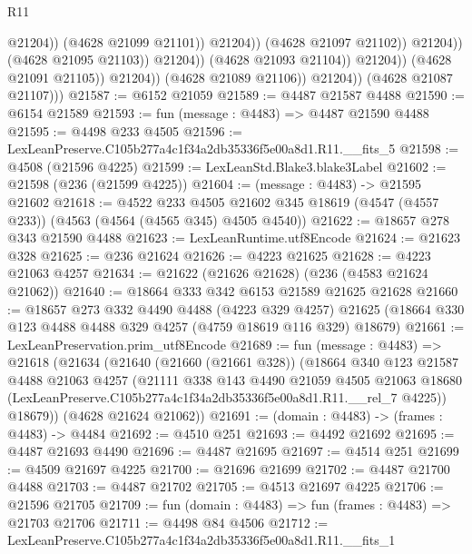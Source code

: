 \begin{lexlean}{R11}
\begin{coremodule}
                                                @21204))
                                            (@4628 @21099 @21101))
                                          @21204))
                                      (@4628 @21097 @21102))
                                    @21204))
                                (@4628 @21095 @21103))
                              @21204))
                          (@4628 @21093 @21104))
                        @21204))
                    (@4628 @21091 @21105))
                  @21204))
              (@4628 @21089 @21106))
            @21204))
        (@4628 @21087 @21107)))
@21587 := @6152 @21059
@21589 := @4487 @21587 @4488
@21590 := @6154 @21589
@21593 := fun (message : @4483) => @4487 @21590 @4488
@21595 := @4498 @233 @4505
@21596 := LexLeanPreserve.C105b277a4c1f34a2db35336f5e00a8d1.R11.__fits_5
@21598 := @4508 (@21596 @4225)
@21599 := LexLeanStd.Blake3.blake3Label
@21602 := @21598 (@236 (@21599 @4225))
@21604 := (message : @4483) -> @21595 @21602
@21618 := @4522
    @233
    @4505
    @21602
    @345
    @18619
    (@4547 (@4557 @233))
    (@4563 (@4564 (@4565 @345) @4505 @4540))
@21622 := @18657 @278 @343 @21590 @4488
@21623 := LexLeanRuntime.utf8Encode
@21624 := @21623 @328
@21625 := @236 @21624
@21626 := @4223 @21625
@21628 := @4223 @21063 @4257
@21634 := @21622 (@21626 @21628) (@236 (@4583 @21624 @21062))
@21640 := @18664 @333 @342 @6153 @21589 @21625 @21628
@21660 := @18657
    @273
    @332
    @4490
    @4488
    (@4223 @329 @4257)
    @21625
    (@18664 @330 @123 @4488 @4488 @329 @4257 (@4759 @18619 @116 @329) @18679)
@21661 := LexLeanPreservation.prim_utf8Encode
@21689 := fun (message : @4483) =>
  @21618
    (@21634
      (@21640
        (@21660 (@21661 @328))
        (@18664
          @340
          @123
          @21587
          @4488
          @21063
          @4257
          (@21111
            @338
            @143
            @4490
            @21059
            @4505
            @21063
            @18680
            (LexLeanPreserve.C105b277a4c1f34a2db35336f5e00a8d1.R11.__rel_7 @4225))
          @18679))
      (@4628 @21624 @21062))
@21691 := (domain : @4483) -> (frames : @4483) -> @4484
@21692 := @4510 @251
@21693 := @4492 @21692
@21695 := @4487 @21693 @4490
@21696 := @4487 @21695
@21697 := @4514 @251
@21699 := @4509 @21697 @4225
@21700 := @21696 @21699
@21702 := @4487 @21700 @4488
@21703 := @4487 @21702
@21705 := @4513 @21697 @4225
@21706 := @21596 @21705
@21709 := fun (domain : @4483) => fun (frames : @4483) => @21703 @21706
@21711 := @4498 @84 @4506
@21712 := LexLeanPreserve.C105b277a4c1f34a2db35336f5e00a8d1.R11.__fits_1

\end{coremodule}
\end{lexlean}

